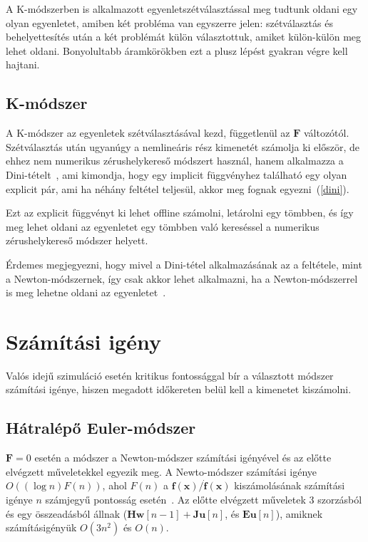A K-módszerben is alkalmazott egyenletszétválasztással meg tudtunk oldani egy olyan egyenletet, amiben két probléma van egyszerre jelen: szétválasztás és behelyettesítés után a két problémát külön választottuk, amiket külön-külön meg lehet oldani. Bonyolultabb áramkörökben ezt a plusz lépést gyakran végre kell hajtani.

\subsection{K-módszer}
A K-módszer az egyenletek szétválasztásával kezd, függetlenül az $\mathbf{F}$ változótól. Szétválasztás után ugyanúgy a nemlineáris rész kimenetét számolja ki először, de ehhez nem numerikus zérushelykereső módszert használ, hanem alkalmazza a Dini-tételt~\cite{borin}, ami kimondja, hogy egy implicit függvényhez található egy olyan explicit pár, ami ha néhány feltétel teljesül, akkor meg fognak egyezni~(\ref{dini}).

Ezt az explicit függvényt ki lehet offline számolni, letárolni egy tömbben, és így meg lehet oldani az egyenletet egy tömbben való kereséssel a numerikus zérushelykereső módszer helyett.

Érdemes megjegyezni, hogy mivel a Dini-tétel alkalmazásának az a feltétele, mint a Newton-módszernek, így csak akkor lehet alkalmazni, ha a Newton-módszerrel is meg lehetne oldani az egyenletet~\cite{otherK}.

\section{Számítási igény}

Valós idejű szimuláció esetén kritikus fontossággal bír a választott módszer számítási igénye, hiszen megadott időkereten belül kell a kimenetet kiszámolni.

\subsection{Hátralépő Euler-módszer}

$\mathbf{F}=0$ esetén a módszer a Newton-módszer számítási igényével és az előtte elvégzett műveletekkel egyezik meg. A Newto-módszer számítási igénye $O((\log{n})F(n))$, ahol $F(n)$ a $\mathbf{f(x)/\dot{f}(x)}$ kiszámolásának számítási igénye $n$ számjegyű pontosság esetén~\cite{wikiNewton}. Az előtte elvégzett műveletek 3 szorzásból és egy összeadásból állnak ($\mathbf{Hw}[n-1]+\mathbf{Ju}[n]$, és $\mathbf{Eu}[n]$), amiknek számításigényük $O(3n^2)$ és $O(n)$. 

